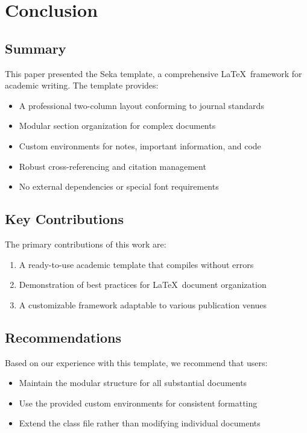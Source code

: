 \section{Conclusion}\label{sec:conclusion}

\subsection{Summary}

This paper presented the Seka template, a comprehensive \LaTeX\ framework for academic writing. The template provides:

\begin{itemize}
    \item A professional two-column layout conforming to journal standards
    \item Modular section organization for complex documents
    \item Custom environments for notes, important information, and code
    \item Robust cross-referencing and citation management
    \item No external dependencies or special font requirements
\end{itemize}

\subsection{Key Contributions}

The primary contributions of this work are:

\begin{enumerate}
    \item A ready-to-use academic template that compiles without errors
    \item Demonstration of best practices for \LaTeX\ document organization
    \item A customizable framework adaptable to various publication venues
\end{enumerate}

\subsection{Recommendations}

Based on our experience with this template, we recommend that users:

\begin{itemize}
    \item Maintain the modular structure for all substantial documents
    \item Use the provided custom environments for consistent formatting
    \item Extend the class file rather than modifying individual documents
\end{itemize}

